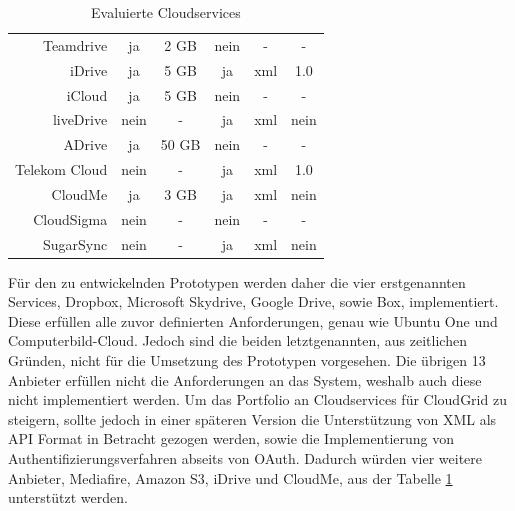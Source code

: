 \begin{table}[htpb]
\begin{tabular}{| r | c c c c c |}
	\rowcolor{lightred}
	Teamdrive          & ja        & 2 GB         & nein        & -           & -       \\
	\rowcolor{lightred}
	iDrive             & ja        & 5 GB         & ja          & xml         & 1.0     \\
	\rowcolor{lightred}
	iCloud             & ja        & 5 GB         & nein        & -           & -       \\
	\rowcolor{lightred}
	liveDrive          & nein      & -            & ja          & xml         & nein    \\
	\rowcolor{lightred}
	ADrive             & ja        & 50 GB        & nein        & -           & -       \\
	\rowcolor{lightred}
	Telekom Cloud      & nein      & -            & ja          & xml         & 1.0     \\
	\rowcolor{lightred}
	CloudMe            & ja        & 3 GB         & ja          & xml         & nein    \\
	\rowcolor{lightred}
	CloudSigma         & nein      & -            & nein        & -           & -       \\
	\rowcolor{lightred}
	SugarSync          & nein      & -            & ja          & xml         & nein    \\
	\hline
\end{tabular}
\caption{Evaluierte Cloudservices}
\label{tabellecloudanbieter}
\end{table}
\newpage

Für den zu entwickelnden Prototypen werden daher die vier erstgenannten Services, Dropbox, Microsoft Skydrive, Google Drive, sowie Box, implementiert.
Diese erfüllen alle zuvor definierten Anforderungen, genau wie Ubuntu One und Computerbild-Cloud.
Jedoch sind die beiden letztgenannten, aus zeitlichen Gründen, nicht für die Umsetzung des Prototypen vorgesehen.
Die übrigen 13 Anbieter erfüllen nicht die Anforderungen an das System, weshalb auch diese nicht implementiert werden.
Um das Portfolio an Cloudservices für CloudGrid zu steigern, sollte jedoch in einer späteren Version die Unterstützung von \ac{XML} als \ac{API} Format in Betracht gezogen werden, sowie die Implementierung von Authentifizierungsverfahren abseits von OAuth.
Dadurch würden vier weitere Anbieter, Mediafire, Amazon S3, iDrive und CloudMe, aus der Tabelle \ref{tabellecloudanbieter} unterstützt werden.

